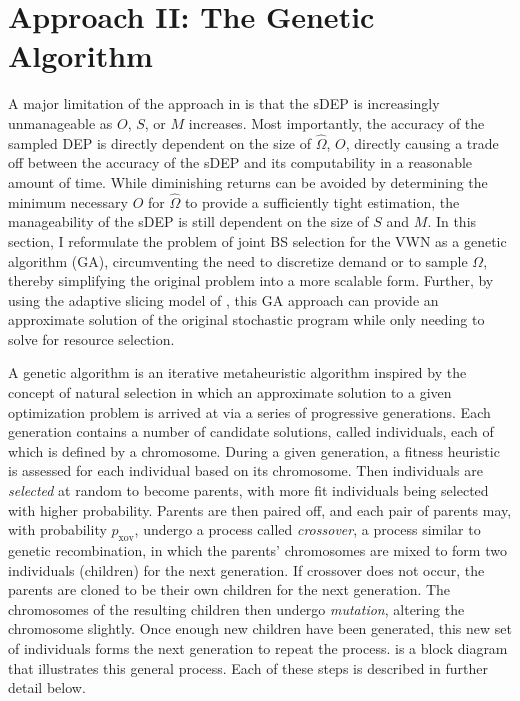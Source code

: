 \documentclass[12pt,dvipsnames]{report}
\begin{document}
\section{Approach II: The Genetic Algorithm} \label{sec:ga}

A major limitation of the approach in  is that the sDEP is increasingly unmanageable as $O$, $S$, or $M$ increases.  Most importantly, the accuracy of the sampled DEP is directly dependent on the size of $\hat{\Omega}$, $O$, directly causing a trade off between the accuracy of the sDEP and its computability in a reasonable amount of time.  While diminishing returns can be avoided by determining the minimum necessary $O$ for $\hat{\Omega}$ to provide a sufficiently tight estimation, the manageability of the sDEP is still dependent on the size of $S$ and $M$.  In this section, I reformulate the problem of joint BS selection for the VWN as a genetic algorithm (GA), circumventing the need to discretize demand or to sample $\Omega$, thereby simplifying the original problem into a more scalable form.  Further, by using the adaptive slicing model of , this GA approach can provide an approximate solution of the original stochastic program while only needing to solve for resource selection.

A genetic algorithm is an iterative metaheuristic algorithm inspired by the concept of natural selection in which an approximate solution to a given optimization problem is arrived at via a series of progressive generations.  Each generation contains a number of candidate solutions, called individuals, each of which is defined by a chromosome.  During a given generation, a fitness heuristic is assessed for each individual based on its chromosome.  Then individuals are \emph{selected} at random to become parents, with more fit individuals being selected with higher probability.  Parents are then paired off, and each pair of parents may, with probability $p_\text{xov}$, undergo a process called \emph{crossover}, a process similar to genetic recombination, in which the parents' chromosomes are mixed to form two individuals (children) for the next generation.  If crossover does not occur, the parents are cloned to be their own children for the next generation.  The chromosomes of the resulting children then undergo \emph{mutation}, altering the chromosome slightly.  Once enough new children have been generated, this new set of individuals forms the next generation to repeat the process.   is a block diagram that illustrates this general process.  Each of these steps is described in further detail below.
\end{document}
